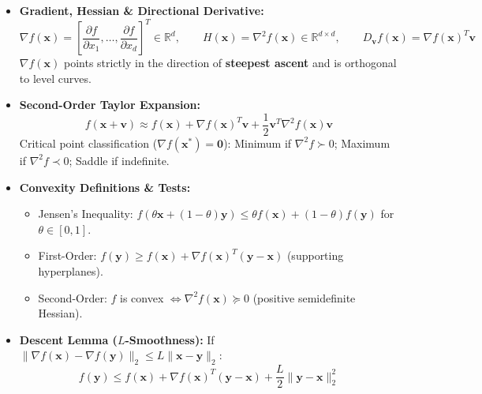 \begin{tcolorbox}[breakable, colback=purplebg!30, colframe=purpleborder, title={\large \textbf{4. Multivariate Calculus \& Numerical Optimization (Weeks 2 \& 8)}}]
\begin{itemize}[leftmargin=*, noitemsep, topsep=2pt]
    \item \textbf{Gradient, Hessian \& Directional Derivative:}
    \begin{equation*}
    \nabla f(\mathbf{x}) = \left[\frac{\partial f}{\partial x_1}, \dots, \frac{\partial f}{\partial x_d}\right]^T \in \mathbb{R}^d, \qquad H(\mathbf{x}) = \nabla^2 f(\mathbf{x}) \in \mathbb{R}^{d \times d}, \qquad D_{\mathbf{v}} f(\mathbf{x}) = \nabla f(\mathbf{x})^T \mathbf{v}
    \end{equation*}
    $\nabla f(\mathbf{x})$ points strictly in the direction of \textbf{steepest ascent} and is orthogonal to level curves.
    \item \textbf{Second-Order Taylor Expansion:}
    \begin{equation*}
    f(\mathbf{x} + \mathbf{v}) \approx f(\mathbf{x}) + \nabla f(\mathbf{x})^T \mathbf{v} + \frac{1}{2} \mathbf{v}^T \nabla^2 f(\mathbf{x}) \mathbf{v}
    \end{equation*}
    Critical point classification ($\nabla f(\mathbf{x}^*) = \mathbf{0}$): Minimum if $\nabla^2 f \succ 0$; Maximum if $\nabla^2 f \prec 0$; Saddle if indefinite.
    \item \textbf{Convexity Definitions \& Tests:}
    \begin{itemize}[leftmargin=*, noitemsep]
        \item Jensen's Inequality: $f(\theta \mathbf{x} + (1-\theta)\mathbf{y}) \le \theta f(\mathbf{x}) + (1-\theta) f(\mathbf{y})$ for $\theta \in [0, 1]$.
        \item First-Order: $f(\mathbf{y}) \ge f(\mathbf{x}) + \nabla f(\mathbf{x})^T(\mathbf{y} - \mathbf{x})$ (supporting hyperplanes).
        \item Second-Order: $f$ is convex $\iff \nabla^2 f(\mathbf{x}) \succeq 0$ (positive semidefinite Hessian).
    \end{itemize}
    \item \textbf{Descent Lemma ($L$-Smoothness):} If $\|\nabla f(\mathbf{x}) - \nabla f(\mathbf{y})\|_2 \le L \|\mathbf{x} - \mathbf{y}\|_2$:
    \begin{equation*}
    f(\mathbf{y}) \le f(\mathbf{x}) + \nabla f(\mathbf{x})^T(\mathbf{y} - \mathbf{x}) + \frac{L}{2}\|\mathbf{y} - \mathbf{x}\|_2^2
    \end{equation*}

\end{itemize}
\end{tcolorbox}
